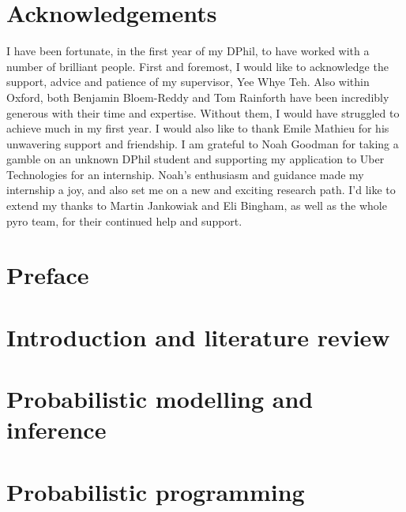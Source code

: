 \documentclass[a4paper, 10pt]{report}
\theoremstyle{plain}
\theoremstyle{definition}
\theoremstyle{remark}
\begin{document}
	
	
	
	\tableofcontents
	
\newpage
	\chapter*{Acknowledgements}
	I have been fortunate, in the first year of my DPhil, to have worked with a number of brilliant people. First and foremost, I would like to acknowledge the support, advice and patience of my supervisor, Yee Whye Teh. Also within Oxford, both Benjamin Bloem-Reddy and Tom Rainforth have been incredibly generous with their time and expertise. Without them, I would have struggled to achieve much in my first year. I would also like to thank Emile Mathieu for his unwavering support and friendship. I am grateful to Noah Goodman for taking a gamble on an unknown DPhil student and supporting my application to Uber Technologies for an internship. Noah's enthusiasm and guidance made my internship a joy, and also set me on a new and exciting research path. I'd like to extend my thanks to Martin Jankowiak and Eli Bingham, as well as the whole pyro team, for their continued help and support.
	
	
	
	\chapter*{Preface}
	\label{chap:preface}
	
	
	\chapter{Introduction and literature review}
	\label{chap:intro}
	
	
	\chapter{Probabilistic modelling and inference}
	\label{chap:probabilistic_modelling}
	
	
	\chapter{Probabilistic programming}
	\label{chap:ppl}
	
	
\end{document}

